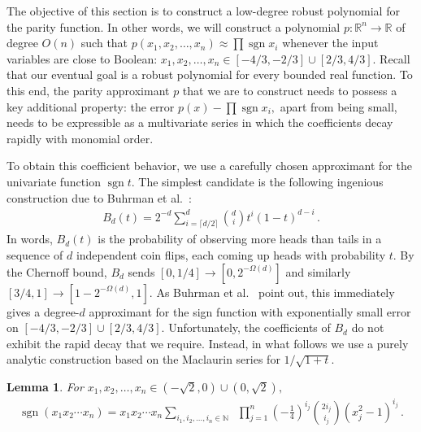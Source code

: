 \documentclass[10pt]{article}
\newtheorem{lemma}[theorem]{Lemma}
\theoremstyle{definition}
\numberwithin{equation}{section}
\newcommand{\R}{{\mathbb R}}
\newcommand{\PARENS}[1]{\left(#1\right)}
\DeclareMathOperator{\sign}{sgn}
\begin{document}
The objective of this section is to construct
a low-degree robust polynomial
for the parity function. In 
other words, we will construct a polynomial
$p\colon\R^n\to\R$ of degree $O(n)$ such that
$p(x_1,x_2,\dots,x_n) \approx \prod \sign x_i$ whenever the
input variables are close to Boolean:
$x_1,x_2,\dots,x_n\in[-4/3,-2/3]\cup[2/3,4/3]$. 
Recall that our eventual goal is a robust polynomial
for every bounded real function. To this end, the parity
approximant $p$ that we are to construct needs to 
possess a key additional
property: the error \mbox{$p(x)-\prod\sign x_i,$} apart from
being small, needs to be expressible as a
multivariate series in which the coefficients decay
rapidly with monomial order. 

To obtain this coefficient behavior, we use a carefully
chosen approximant for the univariate function
$\sign t$. The simplest candidate is 
the following ingenious construction due to 
Buhrman et al.~\cite{robust}:
\begin{align*}
B_d(t) = 2^{-d} \sum_{i=\lceil d/2\rceil}^d {d\choose i}
t^i(1-t)^{d-i}\,.
\end{align*}
In words, $B_d(t)$ is the probability of observing
more heads than tails in a sequence of $d$ independent
coin flips, each coming up heads with probability $t$.
By the Chernoff bound, $B_d$ sends
$[0,1/4]\to[0,2^{-\Omega(d)}]$ and similarly
$[3/4,1]\to[1-2^{-\Omega(d)},1]$. As Buhrman et
al.~\cite{robust} point out, this immediately gives a
degree-$d$ approximant for the sign function with
exponentially small error on
$[-4/3,-2/3]\cup[2/3,4/3]$. Unfortunately, the
coefficients of $B_d$ do not
exhibit the rapid decay that we require.
Instead, in what follows
we use a purely analytic construction based on the
Maclaurin series for $1/\sqrt{1+t}$. 

\begin{lemma}
\label{lem:parity-robust}
For $x_1,x_2,\dots,x_n\in(-\sqrt 2,0)\cup(0,\sqrt 2),$
\begin{align}
\label{eqn:parity-maclaurin}
\sign (x_1x_2\cdots x_n) =
x_1x_2\cdots x_n \sum_{i_1,i_2,\dots,i_n\in\mathbb N} 
\;\; \prod_{j=1}^n \PARENS{-\frac14}^{i_j}{2i_j \choose i_j}
(x_j^2-1)^{i_j}\,.
\end{align}
\end{lemma}
\end{document}

